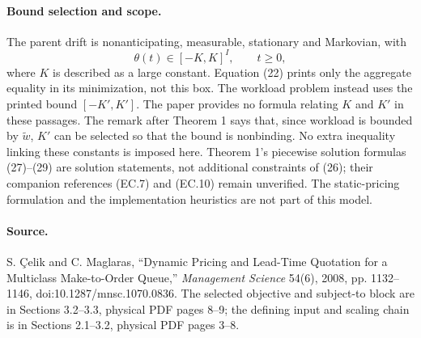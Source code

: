 \documentclass[11pt]{article}
\begin{document}
\paragraph{Bound selection and scope.}
The parent drift is nonanticipating, measurable, stationary and Markovian, with
\[
\theta(t)\in[-K,K]^I,\qquad t\geq0,
\]
where \(K\) is described as a large constant. Equation (22) prints only the aggregate equality in its minimization, not this box. The workload problem instead uses the printed bound \([-K',K']\). The paper provides no formula relating \(K\) and \(K'\) in these passages. The remark after Theorem 1 says that, since workload is bounded by \(\tilde w\), \(K'\) can be selected so that the bound is nonbinding. No extra inequality linking these constants is imposed here. Theorem 1's piecewise solution formulas (27)--(29) are solution statements, not additional constraints of (26); their companion references (EC.7) and (EC.10) remain unverified. The static-pricing formulation and the implementation heuristics are not part of this model.

\paragraph{Source.}
S. \c{C}elik and C. Maglaras, ``Dynamic Pricing and Lead-Time Quotation for a Multiclass Make-to-Order Queue,'' \emph{Management Science} 54(6), 2008, pp. 1132--1146, doi:10.1287/mnsc.1070.0836. The selected objective and subject-to block are in Sections 3.2--3.3, physical PDF pages 8--9; the defining input and scaling chain is in Sections 2.1--3.2, physical PDF pages 3--8.
\end{document}
